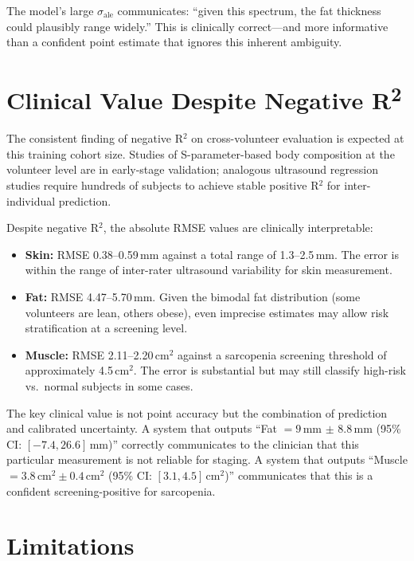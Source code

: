 \documentclass[12pt, a4paper, oneside]{report}
\begin{document}
The model's large $\sigma_{\mathrm{ale}}$ communicates: ``given this spectrum, the fat thickness could plausibly range widely.'' This is clinically correct---and more informative than a confident point estimate that ignores this inherent ambiguity.

\section{Clinical Value Despite Negative R\textsuperscript{2}}

The consistent finding of negative R$^2$ on cross-volunteer evaluation is expected at this training cohort size. Studies of S-parameter-based body composition at the volunteer level are in early-stage validation; analogous ultrasound regression studies require hundreds of subjects to achieve stable positive R$^2$ for inter-individual prediction.

Despite negative R$^2$, the absolute RMSE values are clinically interpretable:
\begin{itemize}[noitemsep]
  \item \textbf{Skin:} RMSE 0.38--0.59\,mm against a total range of 1.3--2.5\,mm. The error is within the range of inter-rater ultrasound variability for skin measurement.
  \item \textbf{Fat:} RMSE 4.47--5.70\,mm. Given the bimodal fat distribution (some volunteers are lean, others obese), even imprecise estimates may allow risk stratification at a screening level.
  \item \textbf{Muscle:} RMSE 2.11--2.20\,cm$^2$ against a sarcopenia screening threshold of approximately 4.5\,cm$^2$. The error is substantial but may still classify high-risk vs.\ normal subjects in some cases.
\end{itemize}

The key clinical value is not point accuracy but the combination of prediction and calibrated uncertainty. A system that outputs ``Fat $= 9$\,mm $\pm$ 8.8\,mm (95\% CI: $[-7.4, 26.6]$\,mm)'' correctly communicates to the clinician that this particular measurement is not reliable for staging. A system that outputs ``Muscle $= 3.8$\,cm$^2 \pm 0.4$\,cm$^2$ (95\% CI: $[3.1, 4.5]$\,cm$^2$)'' communicates that this is a confident screening-positive for sarcopenia.

\section{Limitations}
\end{document}
